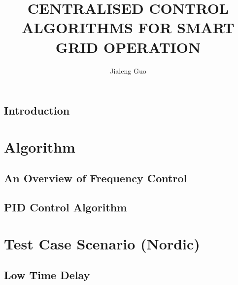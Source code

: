 \documentclass[12pt]{report}
\begin{document}
\title{CENTRALISED CONTROL ALGORITHMS FOR SMART GRID OPERATION}
\author{Jialeng Guo}



\beforepreface
\hypersetup{linkcolor=magenta}

\hypersetup{linkcolor=.}

\afterpreface
\hypersetup{linkcolor=magenta}



\chapter{Introduction}
\label{chapter:intro}





\part{Algorithm}

\chapter{An Overview of Frequency Control}
\label{Chapter2}


\chapter{PID Control Algorithm}
\label{Chapter3}







\part{Test Case Scenario (Nordic)}

\chapter{Low Time Delay}
\label{Chapter4}





\end{document}
